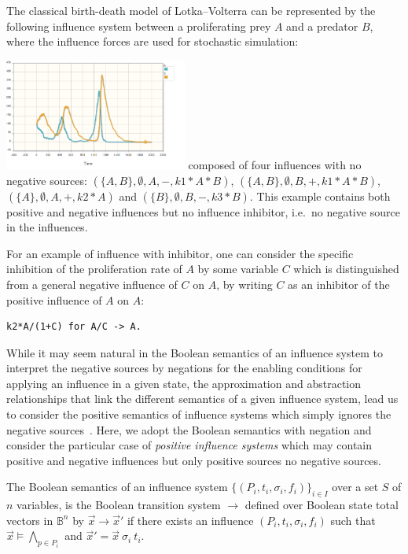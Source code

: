 \documentclass{llncs}
\newcommand{\lra}{\longrightarrow}
\begin{document}
\begin{example}\label{ex:LVi}
   The classical birth-death model of Lotka--Volterra can be represented by the following
influence system between a proliferating prey $A$ and a predator $B$,
where the influence forces are used for stochastic simulation:
  

\vspace{-2cm}\hfill\includegraphics[width=0.45\textwidth]{LVstoch.png}
   composed of four influences with no negative sources:
   $(\{A, B\}, \emptyset, A, -, k1*A*B)$, $(\{A, B\}, \emptyset, B, +, k1*A*B)$, $(\{A\}, \emptyset, A, +, k2*A)$ and $(\{B\}, \emptyset, B, -, k3*B)$.
This example contains both positive and negative influences but no influence inhibitor, i.e.~no negative source in the influences.

For an example of influence with inhibitor, one can consider the specific inhibition of the proliferation rate of $A$ by some variable $C$
which is distinguished from a general negative influence of $C$ on $A$, by writing $C$ as an inhibitor of the positive influence of $A$ on $A$:
   \begin{lstlisting}
k2*A/(1+C) for A/C -> A.
   \end{lstlisting}
\end{example}

While it may seem natural in the Boolean semantics of an influence system to interpret the negative sources by negations
for the enabling conditions for applying an influence in a given state, 
the approximation and abstraction relationships that link the different semantics of a given influence system,
lead us to consider the positive semantics of influence systems which simply ignores the negative sources~\cite{FMRS16cmsb}.
Here, we adopt the Boolean semantics with negation and consider the particular case of \emph{positive influence systems}
which may contain positive and negative influences but only positive sources no negative sources.


\begin{definition}
	The Boolean semantics of an influence system $\{(P_i, t_i, \sigma_i, f_i)\}_{i\in I}$
	over a set $S$ of $n$ variables,
	is the Boolean transition system $\lra$ defined over Boolean state total vectors in $\mathbb{B}^n$
	by
	${\vec x}\lra{\vec x'}$ if there exists an influence $(P_i, t_i, \sigma_i, f_i)$
	such that ${\vec x}\models \bigwedge_{p\in P_i}$
	and ${\vec x'} = {\vec x}\ \sigma_i\ t_i$.
\end{definition}
\end{document}
